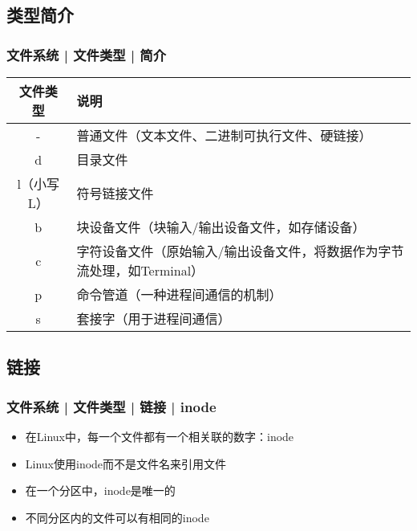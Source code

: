 \subsection{类型简介}
\begin{frame}
  \frametitle{文件系统 | 文件类型 | 简介}
  \begin{table}
    \centering
    \begin{tabular}{cm{}}
      \hline
      \rowcolor{blue!50}文件类型 & 说明\\
      \hline
      \alert{-} & 普通文件（文本文件、二进制可执行文件、硬链接）\\
      \alert{d} & 目录文件\\
      \alert{l（小写L）} & 符号链接文件\\
      b & 块设备文件（块输入/输出设备文件，如存储设备）\\
      c & 字符设备文件（原始输入/输出设备文件，将数据作为字节流处理，如Terminal）\\
      p & 命令管道（一种进程间通信的机制）\\
      s & 套接字（用于进程间通信）\\
      \hline
    \end{tabular}
  \end{table}
\end{frame}

\subsection{链接}
\begin{frame}
  \frametitle{文件系统 | 文件类型 | 链接 | inode}
  \begin{itemize}[<+->]
    \item 在Linux中，每一个文件都有一个相关联的数字：inode
    \item Linux使用inode而不是文件名来引用文件
    \item 在一个分区中，inode是唯一的
    \item 不同分区内的文件可以有相同的inode
  \end{itemize}
  \begin{figure}
    \centering
  \end{figure}
\end{frame}

